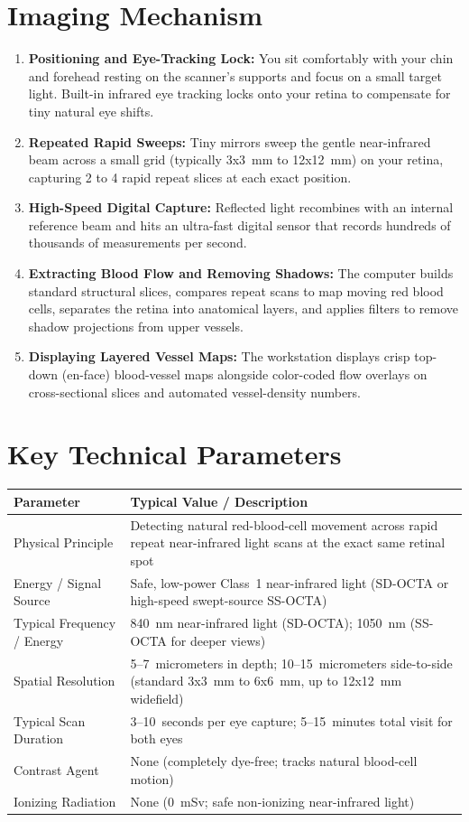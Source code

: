 \section{Imaging Mechanism}
\begin{enumerate}
\item \textbf{Positioning and Eye-Tracking Lock:} You sit comfortably with your chin and forehead resting on the scanner's supports and focus on a small target light. Built-in infrared eye tracking locks onto your retina to compensate for tiny natural eye shifts.
\item \textbf{Repeated Rapid Sweeps:} Tiny mirrors sweep the gentle near-infrared beam across a small grid (typically 3x3~mm to 12x12~mm) on your retina, capturing 2 to 4 rapid repeat slices at each exact position.
\item \textbf{High-Speed Digital Capture:} Reflected light recombines with an internal reference beam and hits an ultra-fast digital sensor that records hundreds of thousands of measurements per second.
\item \textbf{Extracting Blood Flow and Removing Shadows:} The computer builds standard structural slices, compares repeat scans to map moving red blood cells, separates the retina into anatomical layers, and applies filters to remove shadow projections from upper vessels.
\item \textbf{Displaying Layered Vessel Maps:} The workstation displays crisp top-down (en-face) blood-vessel maps alongside color-coded flow overlays on cross-sectional slices and automated vessel-density numbers.
\end{enumerate}

\section{Key Technical Parameters}
\noindent
\begin{tabularx}{\textwidth}{@{}l X@{}}
\toprule
\textbf{Parameter} & \textbf{Typical Value / Description} \\
\midrule
Physical Principle & Detecting natural red-blood-cell movement across rapid repeat near-infrared light scans at the exact same retinal spot \\
Energy / Signal Source & Safe, low-power Class~1 near-infrared light (SD-OCTA or high-speed swept-source SS-OCTA) \\
Typical Frequency / Energy & 840~nm near-infrared light (SD-OCTA); 1050~nm (SS-OCTA for deeper views) \\
Spatial Resolution & 5--7~micrometers in depth; 10--15~micrometers side-to-side (standard 3x3~mm to 6x6~mm, up to 12x12~mm widefield) \\
Typical Scan Duration & 3--10~seconds per eye capture; 5--15~minutes total visit for both eyes \\
Contrast Agent & None (completely dye-free; tracks natural blood-cell motion) \\
Ionizing Radiation & None (0~mSv; safe non-ionizing near-infrared light) \\
\bottomrule
\end{tabularx}

